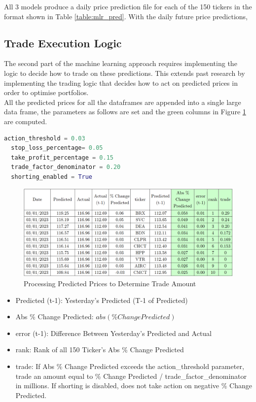 \documentclass[a4paper,12pt]{report}
\numberwithin{equation}{section}
\theoremstyle{definition}
\begin{document}
All 3 models produce a daily price prediction file for each of the 150 tickers in the format shown in Table \ref{table:mlr_pred}. With the daily future price predictions, 

\subsection{Trade Execution Logic}
The second part of the machine learning approach requires implementing the logic to decide how to trade on these predictions. This extends past research by implementing the trading logic that decides how to act on predicted prices in order to optimise portfolios. \\

All the predicted prices for all the dataframes are appended into a single large data frame, the parameters as follows are set and the green columns in Figure \ref{fig:trade_execution_amount} are computed.

\begin{lstlisting}[language=Python, caption=Parameters for Trade Execution, basicstyle=\footnotesize\ttfamily]
  action_threshold = 0.03
  stop_loss_percentage= 0.05
  take_profit_percentage = 0.15
  trade_factor_denominator = 0.20
  shorting_enabled = True
\end{lstlisting}

\begin{figure}[H]
  \centerline{\includegraphics[width=17cm]{determining_trade_amount}}
  \caption{Processing Predicted Prices to Determine Trade Amount}
  \label{fig:trade_execution_amount}
\end{figure}

\begin{itemize}
  \item {Predicted (t-1): Yesterday's Predicted (T-1 of Predicted)}
  \item {Abs \% Change Predicted: $abs(\% Change Predicted)$}
  \item {error (t-1): Difference Between Yesterday's Predicted and Actual}
  \item {rank: Rank of all 150 Ticker's Abs \% Change Predicted}
  \item {trade: If Abs \% Change Predicted exceeds the action\_threshold parameter, trade an amount equal to \% Change Predicted / trade\_factor\_denominator in millions. If shorting is disabled, does not take action on negative \% Change Predicted.}
\end{itemize}
\end{document}
